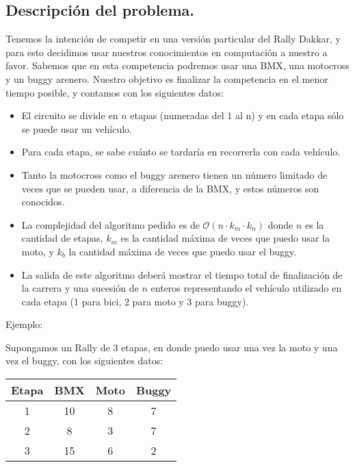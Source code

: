 \subsection{Descripción del problema.}

\vspace*{0.3cm}

Tenemos la intención de competir en una versión particular del Rally Dakkar, y para esto decidimos usar nuestros conocimientos en computación a nuestro a favor. Sabemos que en esta competencia podremos usar una BMX, una motocross y un buggy arenero. Nuestro objetivo es finalizar la competencia en el menor tiempo posible, y contamos con los siguientes datos:

\begin{itemize}
	\item El circuito se divide en $n$ etapas (numeradas del 1 al n) y en cada etapa sólo se puede usar un vehículo.
	\item Para cada etapa, se sabe cuánto se tardaría en recorrerla con cada vehículo.
	\item Tanto la motocross como el buggy arenero tienen un número limitado de veces que se pueden usar, a diferencia de la BMX, y estos números son conocidos.
	\item La complejidad del algoritmo pedido es de $\mathcal{O}(n \cdot k_{m} \cdot k_{n})$ donde $n$ es la cantidad de etapas, $k_{m}$ es la cantidad máxima de veces que puedo usar la moto, y $k_{b}$ la cantidad máxima de veces que puedo usar el buggy.
	\item La salida de este algoritmo deberá mostrar el tiempo total de finalización de la carrera y una sucesión de $n$ enteros representando el vehículo utilizado en cada etapa (1 para bici, 2 para moto y 3 para buggy).
\end{itemize}

Ejemplo:

Supongamos un Rally de 3 etapas, en donde puedo usar una vez la moto y una vez el buggy, con los siguientes datos:

\begin{table}[!ht]
\begin{center}
\begin{tabular}{| c | c | c | c |}
\hline
Etapa & BMX & Moto & Buggy\\
\hline
1 & 10 & 8 & 7\\
\hline
2 & 8 & 3 & 7\\
\hline
3 & 15 & 6 & 2\\
\hline
\end{tabular}
\end{center}
\end{table}

